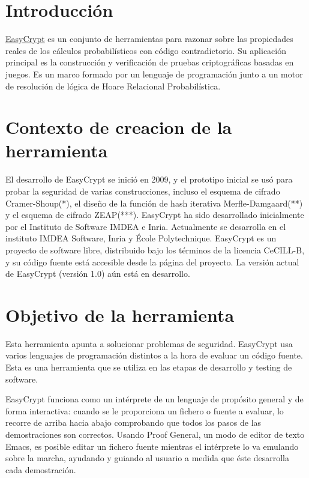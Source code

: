 \documentclass[runningheads,a4paper]{llncs}
\begin{document}
\section{Introducción}
\href{https://www.easycrypt.info/trac/}{EasyCrypt} es un conjunto de herramientas para razonar sobre las propiedades reales de los cálculos probabilísticos con código contradictorio. Su aplicación principal es la construcción y verificación de pruebas criptográficas basadas en juegos. 
Es un marco formado por un lenguaje de programación junto a un motor de resolución de lógica de Hoare Relacional Probabilística. 



\section{Contexto de creacion de la herramienta}
El desarrollo de EasyCrypt se inició en 2009, y el prototipo inicial se usó para probar la seguridad de varias construcciones, incluso el esquema de cifrado Cramer-Shoup(*), el diseño de la función de hash iterativa Merfle-Damgaard(**) y el esquema de cifrado ZEAP(***). EasyCrypt ha sido desarrollado inicialmente por el Instituto de Software IMDEA e Inria. Actualmente se desarrolla en el instituto IMDEA Software, Inria y École Polytechnique. EasyCrypt es un proyecto de software libre, distribuido bajo los términos de la licencia CeCILL-B, y su código fuente está accesible desde la página del proyecto. 
La versión actual de EasyCrypt (versión 1.0) aún está en desarrollo. 

\section{Objetivo de la herramienta} 

Esta herramienta apunta a solucionar problemas de seguridad. EasyCrypt usa varios lenguajes de programación distintos a la hora de evaluar un código fuente. Esta es una herramienta que se utiliza en las etapas de desarrollo y testing de software. 

EasyCrypt funciona como un intérprete de un lenguaje de propósito general y de forma interactiva: cuando se le proporciona un fichero o fuente a evaluar, lo recorre de arriba hacia abajo comprobando que todos los pasos de las demostraciones son correctos. Usando Proof General, un modo de editor de texto Emacs, es posible editar un fichero fuente mientras el intérprete lo va emulando sobre la marcha, ayudando y guiando al usuario a medida que éste desarrolla cada demostración. 
\end{document}
